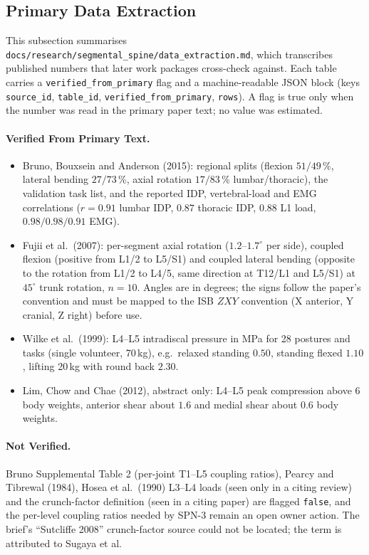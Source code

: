 \subsection{Primary Data Extraction}

This subsection summarises \texttt{docs/research/segmental\_spine/data\_extraction.md},
which transcribes published numbers that later work packages cross-check
against. Each table carries a \texttt{verified\_from\_primary} flag and a
machine-readable JSON block (keys \texttt{source\_id}, \texttt{table\_id},
\texttt{verified\_from\_primary}, \texttt{rows}). A flag is true only when the
number was read in the primary paper text; no value was estimated.

\paragraph{Verified From Primary Text.}
\begin{itemize}
\item Bruno, Bouxsein and Anderson (2015): regional splits (flexion $51/49$\,\%,
  lateral bending $27/73$\,\%, axial rotation $17/83$\,\% lumbar/thoracic), the
  validation task list, and the reported IDP, vertebral-load and EMG
  correlations ($r=0.91$ lumbar IDP, $0.87$ thoracic IDP, $0.88$ L1 load,
  $0.98/0.98/0.91$ EMG).
\item Fujii et al.\ (2007): per-segment axial rotation ($1.2$--$1.7^\circ$ per
  side), coupled flexion (positive from L1/2 to L5/S1) and coupled lateral
  bending (opposite to the rotation from L1/2 to L4/5, same direction at
  T12/L1 and L5/S1) at $45^\circ$ trunk rotation, $n=10$. Angles are in degrees;
  the signs follow the paper's convention and must be mapped to the ISB
  $ZXY$ convention (X anterior, Y cranial, Z right) before use.
\item Wilke et al.\ (1999): L4--L5 intradiscal pressure in MPa for 28 postures
  and tasks (single volunteer, 70\,kg), e.g.\ relaxed standing $0.50$,
  standing flexed $1.10$, lifting 20\,kg with round back $2.30$.
\item Lim, Chow and Chae (2012), abstract only: L4--L5 peak compression above
  $6$ body weights, anterior shear about $1.6$ and medial shear about $0.6$ body
  weights.
\end{itemize}

\paragraph{Not Verified.}
Bruno Supplemental Table 2 (per-joint T1--L5 coupling ratios), Pearcy and
Tibrewal (1984), Hosea et al.\ (1990) L3--L4 loads (seen only in a citing
review) and the crunch-factor definition (seen in a citing paper) are flagged
\texttt{false}, and the per-level coupling ratios needed by SPN-3 remain an
open owner action. The brief's ``Sutcliffe 2008'' crunch-factor source could not
be located; the term is attributed to Sugaya et al.

